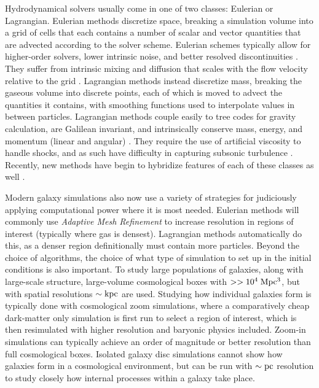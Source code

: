 Hydrodynamical solvers usually come in one of two classes: Eulerian or
Lagrangian.  Eulerian methods discretize space, breaking a simulation volume
into a grid of cells that each contains a number of scalar and vector
quantities that are advected according to the solver scheme.  Eulerian schemes
typically allow for higher-order solvers, lower intrinsic noise, and better
resolved discontinuities \citep{Teyssier2002,Stone2008,Bryan2014}.  They suffer
from intrinsic mixing and diffusion that scales with the flow velocity relative
to the grid \citet{Agertz2007,Tasker2008}.  Lagrangian methods instead
discretize mass, breaking the gaseous volume into discrete points, each of
which is moved to advect the quantities it contains, with smoothing functions
used to interpolate values in between particles.  Lagrangian methods couple
easily to tree codes for gravity calculation, are Galilean invariant, and
intrinsically conserve mass, energy, and momentum (linear and angular)
\citep{Katz1996,Wadsley2004,Springel2005}.  They require the use of artificial
viscosity to handle shocks, and as such have difficulty in capturing subsonic
turbulence \citep{Bauer2012}. Recently, new methods have begin to hybridize
features of each of these classes as well \citep{Springel2010,Hopkins2015}. 

Modern galaxy simulations also now use a variety of strategies for judiciously
applying computational power where it is most needed.  Eulerian methods will
commonly use \textit{Adaptive Mesh Refinement} to increase resolution in regions of
interest (typically where gas is densest).  Lagrangian methods automatically do
this, as a denser region definitionally must contain more particles.  Beyond the
choice of algorithms, the choice of what type of simulation to set up in the
initial conditions is also important.  To study large populations of galaxies,
along with large-scale structure, large-volume cosmological boxes with
$>>10^4\;\rm{Mpc^3}$, but with spatial resolutions $\sim \rm{kpc}$ are used.
Studying how individual galaxies form is typically done with cosmological zoom
simulations, where a comparatively cheap dark-matter only simulation is first
run to select a region of interest, which is then resimulated with higher
resolution and baryonic physics included. Zoom-in simulations can typically
achieve an order of magnitude or better resolution than full cosmological boxes.
Isolated galaxy disc simulations cannot show how galaxies form in a cosmological
environment, but can be run with $\sim \rm{pc}$ resolution to study closely how
internal processes within a galaxy take place.

